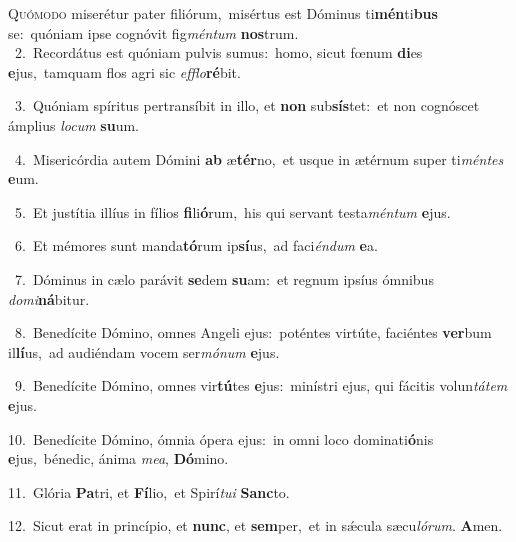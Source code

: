 \lettrine{\initial\textcolor{\initialcolor}{Q}}{uómodo} miserétur pater filiórum,~\dagger misértus est Dóminus ti\-\textbf{mén}\-ti\textbf{bus} se:~\star quóniam ipse cognóvit fig\-\textit{mén}\-\textit{tum} \textbf{nos}\-trum.\\
{\numbfont\textcolor{\numbcolor}{~2.}}~Recordátus est quóniam pulvis sumus:~\dagger homo, sicut fœnum \textbf{di}\-es \textbf{e}\-jus,~\star tamquam flos agri sic \textit{ef}\-\textit{flo}\textbf{ré}bit.\par
{\numbfont\textcolor{\numbcolor}{~3.}}~Quóniam spíritus pertransíbit in illo, et \textbf{non} sub\-\textbf{sís}\-tet:~\star et non cognóscet ámplius \textit{lo}\-\textit{cum} \textbf{su}\-um.\par
{\numbfont\textcolor{\numbcolor}{~4.}}~Misericórdia autem Dómini \textbf{ab} æ\-\textbf{tér}\-no,~\star et usque in ætérnum super ti\-\textit{mén}\-\textit{tes} \textbf{e}\-um.\par
{\numbfont\textcolor{\numbcolor}{~5.}}~Et justítia illíus in fílios \textbf{fi}\-li\-\textbf{ó}\-rum,~\star his qui servant testa\-\textit{mén}\-\textit{tum} \textbf{e}\-jus.\par
{\numbfont\textcolor{\numbcolor}{~6.}}~Et mémores sunt manda\-\textbf{tó}\-rum ip\-\textbf{sí}\-us,~\star ad faci\-\textit{én}\-\textit{dum} \textbf{e}\-a.\par
{\numbfont\textcolor{\numbcolor}{~7.}}~Dóminus in cælo parávit \textbf{se}\-dem \textbf{su}\-am:~\star et regnum ipsíus ómnibus \textit{do}\-\textit{mi}\textbf{ná}bitur.\par
{\numbfont\textcolor{\numbcolor}{~8.}}~Benedícite Dómino, omnes Angeli ejus:~\dagger poténtes virtúte, faciéntes \textbf{ver}\-bum il\-\textbf{lí}\-us,~\star ad audiéndam vocem ser\-\textit{mó}\-\textit{num} \textbf{e}\-jus.\par
{\numbfont\textcolor{\numbcolor}{~9.}}~Benedícite Dómino, omnes vir\-\textbf{tú}\-tes \textbf{e}\-jus:~\star minístri ejus, qui fácitis volun\-\textit{tá}\-\textit{tem} \textbf{e}\-jus.\par
{\numbfont\textcolor{\numbcolor}{10.}}~Benedícite Dómino, ómnia ópera ejus:~\dagger in omni loco dominati\-\textbf{ó}\-nis \textbf{e}\-jus,~\star bénedic, ánima \textit{me}\-\textit{a}, \textbf{Dó}\-mino.\par
{\numbfont\textcolor{\numbcolor}{11.}}~Glória \textbf{Pa}\-tri, et \textbf{Fí}\-lio,~\star et Spirí\-\textit{tu}\-\textit{i} \textbf{Sanc}\-to.\par
{\numbfont\textcolor{\numbcolor}{12.}}~Sicut erat in princípio, et \textbf{nunc}\-, et \textbf{sem}\-per,~\star et in sǽcula sæcu\-\textit{ló}\-\textit{rum}. \textbf{A}\-men.\par
